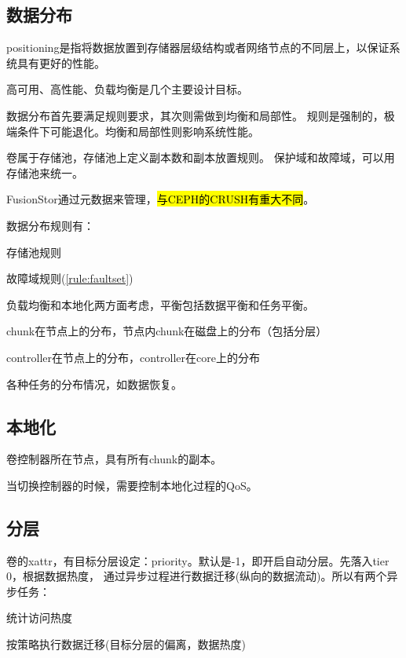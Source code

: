 \subsection{数据分布}

positioning是指将数据放置到存储器层级结构或者网络节点的不同层上，以保证系统具有更好的性能。

高可用、高性能、负载均衡是几个主要设计目标。

数据分布首先要满足规则要求，其次则需做到均衡和局部性。
规则是强制的，极端条件下可能退化。均衡和局部性则影响系统性能。

卷属于存储池，存储池上定义副本数和副本放置规则。
保护域和故障域，可以用存储池来统一。

FusionStor通过元数据来管理，\hl{与CEPH的CRUSH有重大不同}。

数据分布规则有：
\begin{compactitem}
\item 存储池规则
\item 故障域规则(\ref{rule:faultset})
\end{compactitem}

负载均衡和本地化两方面考虑，平衡包括数据平衡和任务平衡。

chunk在节点上的分布，节点内chunk在磁盘上的分布（包括分层）

controller在节点上的分布，controller在core上的分布

各种任务的分布情况，如数据恢复。

\subsection{本地化}

卷控制器所在节点，具有所有chunk的副本。

当切换控制器的时候，需要控制本地化过程的QoS。

\subsection{分层}

卷的xattr，有目标分层设定：priority。默认是-1，即开启自动分层。先落入tier 0，根据数据热度，
通过异步过程进行数据迁移(纵向的数据流动)。所以有两个异步任务：
\begin{compactenum}
\item 统计访问热度
\item 按策略执行数据迁移(目标分层的偏离，数据热度)
\end{compactenum}

